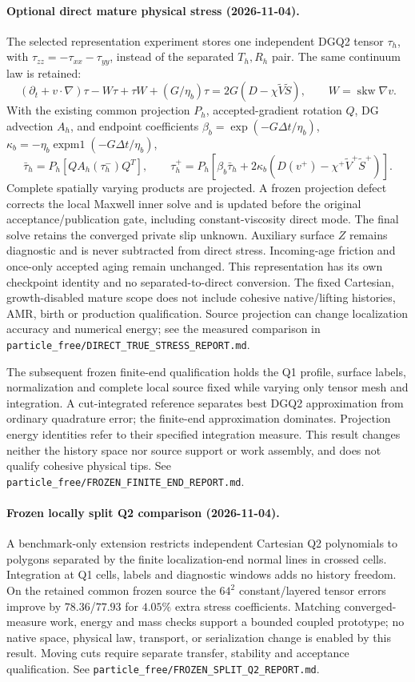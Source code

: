 \documentclass[11pt]{article}
\begin{document}
\paragraph{Optional direct mature physical stress (2026-11-04).}
The selected representation experiment stores one independent DGQ2 tensor
$\tau_h$, with $\tau_{zz}=-\tau_{xx}-\tau_{yy}$, instead of the separated
$T_h,R_h$ pair. The same continuum law is retained:
\[
 (\partial_t+v\cdot\nabla)\tau-W\tau+\tau W+(G/\eta_b)\tau
 =2G(D-\chi\widetilde V\widetilde S),\qquad W=\operatorname{skw}\nabla v.
\]
With the existing common projection $P_h$, accepted-gradient rotation $Q$,
DG advection $A_h$, and endpoint coefficients
$\beta_b=\exp(-G\Delta t/\eta_b)$,
$\kappa_b=-\eta_b\operatorname{expm1}(-G\Delta t/\eta_b)$,
\[
 \bar\tau_h=P_h[Q A_h(\tau_h^-)Q^T],\qquad
 \tau_h^+=P_h[\beta_b\bar\tau_h+2\kappa_b(D(v^+)-\chi^+\widetilde V^+\widetilde S^+)].
\]
Complete spatially varying products are projected. A frozen projection defect
corrects the local Maxwell inner solve and is updated before the original
acceptance/publication gate, including constant-viscosity direct mode. The final
solve retains the converged private slip unknown. Auxiliary surface $Z$ remains
diagnostic and is never subtracted from direct stress. Incoming-age friction and
once-only accepted aging remain unchanged. This representation has its own
checkpoint identity and no separated-to-direct conversion. The fixed Cartesian,
growth-disabled mature scope does not include cohesive native/lifting histories,
AMR, birth or production qualification. Source projection can change localization
accuracy and numerical energy; see the measured comparison in
\texttt{particle\_free/DIRECT\_TRUE\_STRESS\_REPORT.md}.

The subsequent frozen finite-end qualification holds the Q1 profile, surface
labels, normalization and complete local source fixed while varying only tensor
mesh and integration. A cut-integrated reference separates best DGQ2
approximation from ordinary quadrature error; the finite-end approximation
dominates. Projection energy identities refer to their specified integration
measure. This result changes neither the history space nor source support or
work assembly, and does not qualify cohesive physical tips. See
\texttt{particle\_free/FROZEN\_FINITE\_END\_REPORT.md}.

\paragraph{Frozen locally split Q2 comparison (2026-11-04).}
A benchmark-only extension restricts independent Cartesian Q2 polynomials to
polygons separated by the finite localization-end normal lines in crossed cells.
Integration at Q1 cells, labels and diagnostic windows adds no history freedom.
On the retained common frozen source the $64^2$ constant/layered tensor errors
improve by $78.36$/$77.93$ for $4.05\%$ extra stress coefficients. Matching
converged-measure work, energy and mass checks support a bounded coupled
prototype; no native space, physical law, transport, or serialization change is
enabled by this result. Moving cuts require separate transfer, stability and
acceptance qualification. See
\texttt{particle\_free/FROZEN\_SPLIT\_Q2\_REPORT.md}.
\end{document}

